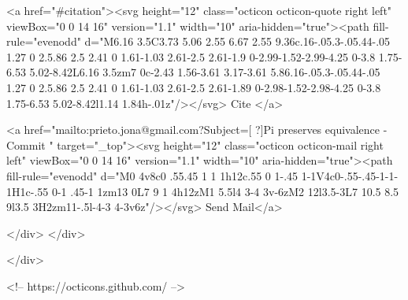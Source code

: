       <a  href="#citation"><svg height="12" class="octicon octicon-quote right left" viewBox="0 0 14 16" version="1.1" width="10" aria-hidden="true"><path fill-rule="evenodd" d="M6.16 3.5C3.73 5.06 2.55 6.67 2.55 9.36c.16-.05.3-.05.44-.05 1.27 0 2.5.86 2.5 2.41 0 1.61-1.03 2.61-2.5 2.61-1.9 0-2.99-1.52-2.99-4.25 0-3.8 1.75-6.53 5.02-8.42L6.16 3.5zm7 0c-2.43 1.56-3.61 3.17-3.61 5.86.16-.05.3-.05.44-.05 1.27 0 2.5.86 2.5 2.41 0 1.61-1.03 2.61-2.5 2.61-1.89 0-2.98-1.52-2.98-4.25 0-3.8 1.75-6.53 5.02-8.42l1.14 1.84h-.01z"/></svg> Cite
      </a>

      <a href="mailto:prieto.jona@gmail.com?Subject=[ ?]Pi preserves equivalence - Commit " target="_top"><svg height="12" class="octicon octicon-mail right left" viewBox="0 0 14 16" version="1.1" width="10" aria-hidden="true"><path fill-rule="evenodd" d="M0 4v8c0 .55.45 1 1 1h12c.55 0 1-.45 1-1V4c0-.55-.45-1-1-1H1c-.55 0-1 .45-1 1zm13 0L7 9 1 4h12zM1 5.5l4 3-4 3v-6zM2 12l3.5-3L7 10.5 8.5 9l3.5 3H2zm11-.5l-4-3 4-3v6z"/></svg> Send Mail</a>

    </div>
  </div>

</div>

<!-- https://octicons.github.com/ -->





